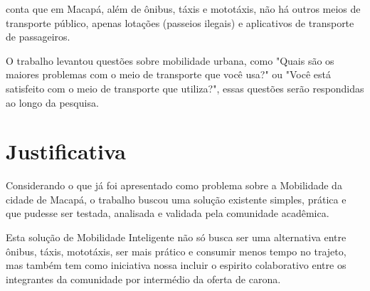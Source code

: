  conta que em Macapá, além de ônibus, táxis e mototáxis, não há outros meios de transporte público, apenas lotações (passeios ilegais) e aplicativos de transporte de passageiros.

O trabalho levantou questões sobre mobilidade urbana, como "Quais são os maiores problemas com o meio de transporte que você usa?" ou "Você está satisfeito com o meio de transporte que utiliza?", essas questões serão respondidas ao longo da pesquisa.






\section{Justificativa}



Considerando o que já foi apresentado como problema sobre a Mobilidade da cidade de Macapá, o trabalho buscou uma solução existente simples, prática e que pudesse ser testada, analisada e validada pela comunidade acadêmica. 



Esta solução de Mobilidade Inteligente não só busca ser uma alternativa entre ônibus, táxis, mototáxis, ser mais prático e consumir menos tempo no trajeto, mas também tem como iniciativa nossa incluir o espirito colaborativo entre os integrantes da comunidade por intermédio da oferta de carona.




